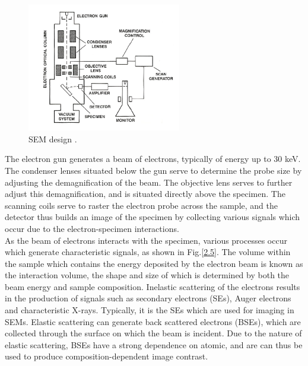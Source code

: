 \begin{figure}[h]
	\centering
	\includegraphics[width=0.6\textwidth]{Figs/Ch2/SEM.png}
	\caption {SEM design \cite{YacobiHolt1990}.}
	\label{2.4}
\end{figure}
\FloatBarrier

The electron gun generates a beam of electrons, typically of energy up to 30 keV. The condenser lenses situated below the gun serve to determine the probe size by adjusting the demagnification of the beam. The objective lens serves to further adjust this demagnification, and is situated directly above the specimen. The scanning coils serve to raster the electron probe across the sample, and the detector thus builds an image of the specimen by collecting various signals which occur due to the electron-specimen interactions.\\
As the beam of electrons interacts with the specimen, various processes occur which generate characteristic signals, as shown in Fig.\ref{2.5}. The volume within the sample which contains the energy deposited by the electron beam is known as the interaction volume, the shape and size of which is determined by both the beam energy and sample composition. Inelastic scattering of the electrons results in the production of signals such as secondary electrons  (SEs), Auger electrons and characteristic X-rays. Typically, it is the SEs which are used for imaging in SEMs. Elastic scattering can generate back scattered electrons  (BSEs), which are collected through the surface on which the beam is incident. Due to the nature of elastic scattering, BSEs have a strong dependence on atomic, and are can thus be used to produce composition-dependent image contrast.

